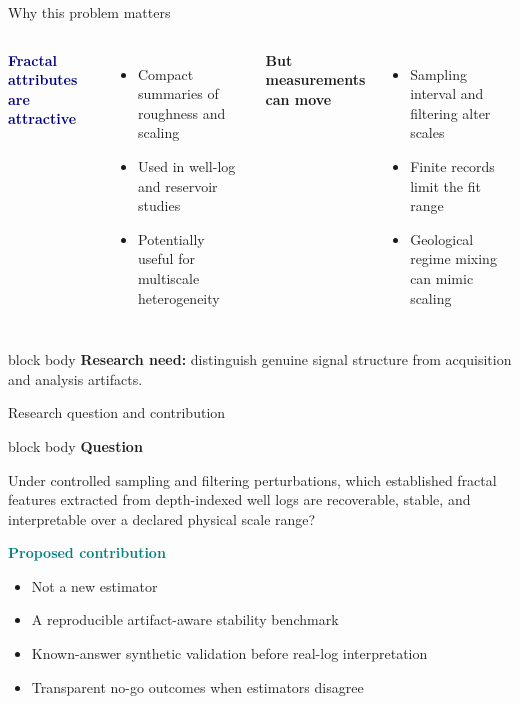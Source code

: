 \documentclass[aspectratio=169,11pt]{beamer}
\begin{document}
\begin{frame}{Why this problem matters}
\begin{columns}[T,onlytextwidth]
\textcolor{Navy}{\Large\bfseries Fractal attributes are attractive}
\vspace{0.2cm}
\begin{itemize}
  \item Compact summaries of roughness and scaling
  \item Used in well-log and reservoir studies
  \item Potentially useful for multiscale heterogeneity
\end{itemize}
\textcolor{Amber}{\Large\bfseries But measurements can move}
\vspace{0.2cm}
\begin{itemize}
  \item Sampling interval and filtering alter scales
  \item Finite records limit the fit range
  \item Geological regime mixing can mimic scaling
\end{itemize}
\end{columns}
\vfill
\begin{beamercolorbox}[sep=0.25cm,wd=\textwidth]{block body}
\centering\textbf{Research need:} distinguish genuine signal structure from acquisition and analysis artifacts.
\end{beamercolorbox}
\end{frame}

\begin{frame}{Research question and contribution}
\begin{beamercolorbox}[sep=0.35cm,wd=\textwidth]{block body}
\large\textbf{Question}\par\vspace{0.1cm}
Under controlled sampling and filtering perturbations, which established fractal features extracted from depth-indexed well logs are recoverable, stable, and interpretable over a declared physical scale range?
\end{beamercolorbox}
\vspace{0.35cm}
\textcolor{Teal}{\Large\bfseries Proposed contribution}
\begin{itemize}
  \item Not a new estimator
  \item A reproducible artifact-aware stability benchmark
  \item Known-answer synthetic validation before real-log interpretation
  \item Transparent no-go outcomes when estimators disagree
\end{itemize}
\end{frame}
\end{document}
